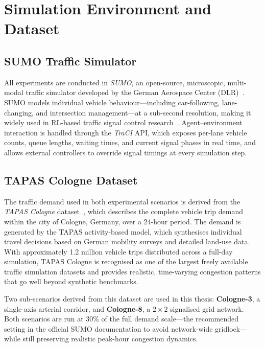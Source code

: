 \section{Simulation Environment and Dataset}

\subsection{SUMO Traffic Simulator}

All experiments are conducted in \textit{SUMO}, an
open-source, microscopic, multi-modal traffic simulator developed by the German
Aerospace Center (DLR)~\cite{lopez2018sumo}. SUMO models individual vehicle
behaviour---including car-following, lane-changing, and intersection management---at
a sub-second resolution, making it widely used in RL-based traffic signal control
research~\cite{marl_tsc_sustainability2023}. Agent--environment interaction is
handled through the \textit{TraCI} API, which exposes
per-lane vehicle counts, queue lengths, waiting times, and current signal phases in
real time, and allows external controllers to override signal timings at every
simulation step.

\subsection{TAPAS Cologne Dataset}

The traffic demand used in both experimental scenarios is derived from the
\textit{TAPAS Cologne} dataset~\cite{tapas_cologne_sumo}, which describes the
complete vehicle trip demand within the city of Cologne, Germany, over a 24-hour
period. The demand is generated by the TAPAS activity-based model, which synthesises
individual travel decisions based on German mobility surveys and detailed land-use
data. With approximately 1.2 million vehicle trips distributed across a full-day
simulation, TAPAS Cologne is recognised as one of the largest freely available
traffic simulation datasets and provides realistic, time-varying congestion patterns
that go well beyond synthetic benchmarks.

Two sub-scenarios derived from this dataset are used in this thesis: \textbf{Cologne-3},
a single-axis arterial corridor, and \textbf{Cologne-8}, a $2{\times}2$ signalised
grid network. Both scenarios are run at 30\% of the full demand scale---the
recommended setting in the official SUMO documentation to avoid network-wide
gridlock---while still preserving realistic peak-hour congestion dynamics.